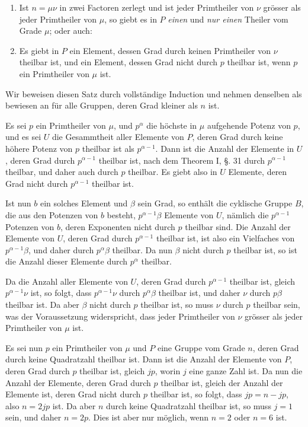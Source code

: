 \documentclass[12pt,a4paper]{article}
\theoremstyle{plain}
\theoremstyle{definition}
\theoremstyle{remark}
\begin{document}
\begin{enumerate}[label=\alph*)]
\item Ist $n = \mu\nu$ in zwei Factoren zerlegt und ist jeder Primtheiler von $\nu$ grösser als jeder Primtheiler von $\mu$, so giebt es in $P$ \emph{einen} und \emph{nur einen} Theiler vom Grade $\mu$; oder auch:
\item Es giebt in $P$ ein Element, dessen Grad durch keinen Primtheiler von $\nu$ theilbar ist, und ein Element, dessen Grad nicht durch $p$ theilbar ist, wenn $p$ ein Primtheiler von $\mu$ ist.
\end{enumerate}

Wir beweisen diesen Satz durch vollständige Induction und nehmen denselben als bewiesen an für alle Gruppen, deren Grad kleiner als $n$ ist.

Es sei $p$ ein Primtheiler von $\mu$, und $p^{\alpha}$ die höchste in $\mu$ aufgehende Potenz von $p$, und es sei $U$ die Gesammtheit aller Elemente von $P$, deren Grad durch keine höhere Potenz von $p$ theilbar ist als $p^{\alpha-1}$. Dann ist die Anzahl der Elemente in $U$, deren Grad durch $p^{\alpha-1}$ theilbar ist, nach dem Theorem I, \S. 31 durch $p^{\alpha-1}$ theilbar, und daher auch durch $p$ theilbar. Es giebt also in $U$ Elemente, deren Grad nicht durch $p^{\alpha-1}$ theilbar ist.

Ist nun $b$ ein solches Element und $\beta$ sein Grad, so enthält die cyklische Gruppe $B$, die aus den Potenzen von $b$ besteht, $p^{\alpha-1}\beta$ Elemente von $U$, nämlich die $p^{\alpha-1}$ Potenzen von $b$, deren Exponenten nicht durch $p$ theilbar sind. Die Anzahl der Elemente von $U$, deren Grad durch $p^{\alpha-1}$ theilbar ist, ist also ein Vielfaches von $p^{\alpha-1}\beta$, und daher durch $p^{\alpha}\beta$ theilbar. Da nun $\beta$ nicht durch $p$ theilbar ist, so ist die Anzahl dieser Elemente durch $p^{\alpha}$ theilbar.

Da die Anzahl aller Elemente von $U$, deren Grad durch $p^{\alpha-1}$ theilbar ist, gleich $p^{\alpha-1}\nu$ ist, so folgt, dass $p^{\alpha-1}\nu$ durch $p^{\alpha}\beta$ theilbar ist, und daher $\nu$ durch $p\beta$ theilbar ist. Da aber $\beta$ nicht durch $p$ theilbar ist, so muss $\nu$ durch $p$ theilbar sein, was der Voraussetzung widerspricht, dass jeder Primtheiler von $\nu$ grösser als jeder Primtheiler von $\mu$ ist.

Es sei nun $p$ ein Primtheiler von $\mu$ und $P$ eine Gruppe vom Grade $n$, deren Grad durch keine Quadratzahl theilbar ist. Dann ist die Anzahl der Elemente von $P$, deren Grad durch $p$ theilbar ist, gleich $jp$, worin $j$ eine ganze Zahl ist. Da nun die Anzahl der Elemente, deren Grad durch $p$ theilbar ist, gleich der Anzahl der Elemente ist, deren Grad nicht durch $p$ theilbar ist, so folgt, dass $jp = n - jp$, also $n = 2jp$ ist. Da aber $n$ durch keine Quadratzahl theilbar ist, so muss $j = 1$ sein, und daher $n = 2p$. Dies ist aber nur möglich, wenn $n = 2$ oder $n = 6$ ist.
\end{document}
